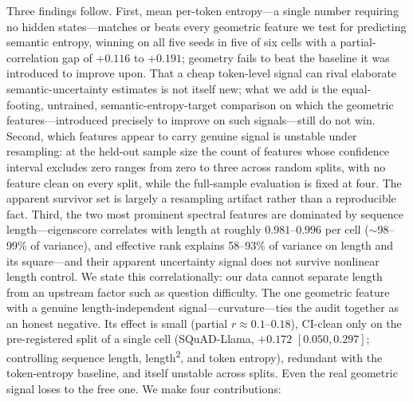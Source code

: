 \documentclass[11pt]{article}
\begin{document}
Three findings follow. First, mean per-token entropy---a single number requiring no hidden states---matches or beats every geometric feature we test for predicting semantic entropy, winning on all five seeds in five of six cells with a partial-correlation gap of $+0.116$ to $+0.191$; geometry fails to beat the baseline it was introduced to improve upon. That a cheap token-level signal can rival elaborate semantic-uncertainty estimates is not itself new; what we add is the equal-footing, untrained, semantic-entropy-target comparison on which the geometric features---introduced precisely to improve on such signals---still do not win. Second, which features appear to carry genuine signal is unstable under resampling: at the held-out sample size the count of features whose confidence interval excludes zero ranges from zero to three across random splits, with no feature clean on every split, while the full-sample evaluation is fixed at four. The apparent survivor set is largely a resampling artifact rather than a reproducible fact. Third, the two most prominent spectral features are dominated by sequence length---eigenscore correlates with length at roughly $0.981$--$0.996$ per cell ($\sim$98--99\% of variance), and effective rank explains 58--93\% of variance on length and its square---and their apparent uncertainty signal does not survive nonlinear length control. We state this correlationally: our data cannot separate length from an upstream factor such as question difficulty.
The one geometric feature with a genuine length-independent signal---curvature---ties the audit together as an honest negative. Its effect is small (partial $r \approx 0.1$--$0.18$), CI-clean only on the pre-registered split of a single cell (SQuAD-Llama, $+0.172$ $[0.050, 0.297]$; controlling sequence length, length\textsuperscript{2}, and token entropy), redundant with the token-entropy baseline, and itself unstable across splits. Even the real geometric signal loses to the free one.
We make four contributions:
\end{document}
